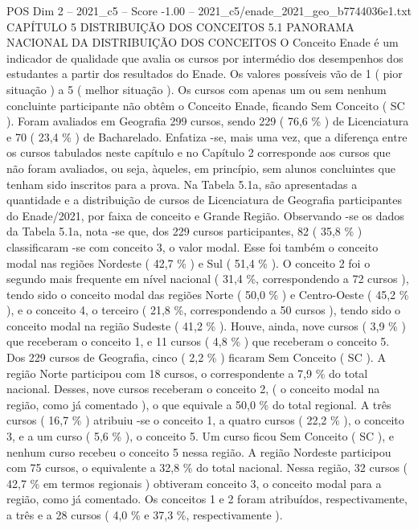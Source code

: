 \begin{textsample}{POS Dim 2 – 2021\_c5 – Score -1.00 – 2021\_c5/enade\_2021\_geo\_b7744036e1.txt}  \label{ex:f2_pos_292}
CAPÍTULO 5 DISTRIBUIÇÃO DOS CONCEITOS 5.1 PANORAMA NACIONAL DA DISTRIBUIÇÃO DOS CONCEITOS O Conceito Enade é um indicador de qualidade que avalia os cursos por intermédio dos desempenhos dos estudantes a partir dos resultados do Enade.
Os valores possíveis vão de 1 ( pior situação ) a 5 ( melhor situação ).
Os cursos com apenas um ou sem nenhum concluinte participante não obtêm o Conceito Enade, ficando Sem Conceito ( SC ).
Foram avaliados em Geografia 299 cursos, sendo 229 ( 76,6 \% ) de Licenciatura e 70 ( 23,4 \% ) de Bacharelado.
Enfatiza -se, mais uma vez, que a diferença entre os cursos tabulados neste capítulo e no Capítulo 2 corresponde aos cursos que não foram avaliados, ou seja, àqueles, em princípio, sem alunos concluintes que tenham sido inscritos para a prova.
Na Tabela 5.1a, são apresentadas a quantidade e a distribuição de cursos de Licenciatura de Geografia participantes do Enade/2021, por faixa de conceito e Grande Região.
Observando -se os dados da Tabela 5.1a, nota -se que, dos 229 cursos participantes, 82 ( 35,8 \% ) classificaram -se com conceito 3, o valor modal.
Esse foi também o conceito modal nas regiões Nordeste ( 42,7 \% ) e Sul ( 51,4 \% ).
O conceito 2 foi o segundo mais frequente em nível nacional ( 31,4 \%, correspondendo a 72 cursos ), tendo sido o conceito modal das regiões Norte ( 50,0 \% ) e Centro-Oeste ( 45,2 \% ), e o conceito 4, o terceiro ( 21,8 \%, correspondendo a 50 cursos ), tendo sido o conceito modal na região Sudeste ( 41,2 \% ).
Houve, ainda, nove cursos ( 3,9 \% ) que receberam o conceito 1, e 11 cursos ( 4,8 \% ) que receberam o conceito 5.
Dos 229 cursos de Geografia, cinco ( 2,2 \% ) ficaram Sem Conceito ( SC ).
A região Norte participou com 18 cursos, o correspondente a 7,9 \% do total nacional.
Desses, nove cursos receberam o conceito 2, ( o conceito modal na região, como já comentado ), o que equivale a 50,0 \% do total regional.
A três cursos ( 16,7 \% ) atribuiu -se o conceito 1, a quatro cursos ( 22,2 \% ), o conceito 3, e a um curso ( 5,6 \% ), o conceito 5.
Um curso ficou Sem Conceito ( SC ), e nenhum curso recebeu o conceito 5 nessa região.
A região Nordeste participou com 75 cursos, o equivalente a 32,8 \% do total nacional.
Nessa região, 32 cursos ( 42,7 \% em termos regionais ) obtiveram conceito 3, o conceito modal para a região, como já comentado.
Os conceitos 1 e 2 foram atribuídos, respectivamente, a três e a 28 cursos ( 4,0 \% e 37,3 \%, respectivamente ).

\end{textsample}
